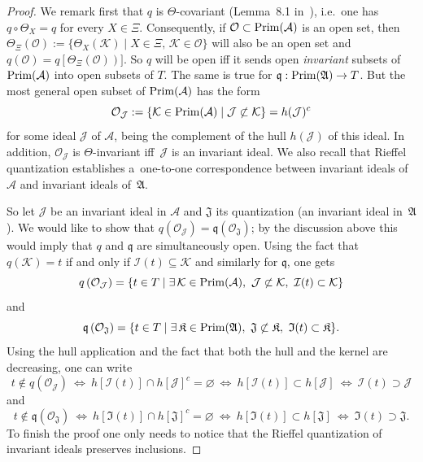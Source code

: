 \documentclass[11pt]{article}
\def\A{{\mathcal A}}
\def\Th{\Theta}
\def\AA{\mathfrak A}
\begin{document}
\begin{proof}
We remark f\/irst that $q$ is $\Th$-covariant (Lemma~8.1 in~\cite{Wi}), i.e.\ one has $q\circ\Th_X=q$ for every $X\in\Xi$.
Consequently, if $\mathcal O\subset {\rm Prim}(\A)$ is
an open set, then $\Th_\Xi(\mathcal O):=\{\Th_X(\mathcal K)\mid X\in\Xi, \, \mathcal K\in\mathcal O\}$ will also be an open set
and $q(\mathcal O)=q\left[\Th_\Xi(\mathcal O)\right)]$.
So $q$ will be open if\/f it sends open {\it invariant} subsets of ${\rm Prim}(\A)$
into open subsets of $T$. The same is true for $\mathfrak q:{\rm Prim}(\AA)\rightarrow T$. But the most general
open subset of ${\rm Prim}(\A)$ has the form
\[
\mathcal O_{\mathcal J}:=\{\mathcal K\in {\rm Prim}(\A)\mid \mathcal J\not\subset\mathcal K\}=h(\mathcal J)^c
\]
for some ideal $\mathcal J$ of $\A$, being the complement of the hull  $h(\mathcal J)$ of this ideal.
In addition, $\mathcal O_{\mathcal J}$ is $\Th$-invariant if\/f~$\mathcal J$ is an
invariant ideal. We also recall that Rief\/fel quantization establishes
a~one-to-one correspondence between invariant ideals of $\A$ and invariant ideals of~$\AA$.

So let $\mathcal J$ be an invariant ideal in $\A$ and $\mathfrak J$ its quantization
(an invariant ideal in~$\AA$). We would like to show that
$q\left(\mathcal O_\mathcal J\right)=\mathfrak q\left(\mathcal O_\mathfrak J\right)$;
by the discussion above this would imply that $q$ and $\mathfrak q$ are simultaneously open. Using the fact that
$q(\mathcal K)=t$ if and only if $\mathcal I(t)\subseteq \mathcal K$ and similarly for $\mathfrak q$, one gets
\[
q\left(\mathcal O_\mathcal J\right)=\{t\in T\mid \exists\,\mathcal K\in {\rm Prim}(\A),\ \mathcal J\not\subset\mathcal K,
\ \mathcal I(t)\subset\mathcal K\}
\]
and
\[
\mathfrak q\left(\mathcal O_\mathfrak J\right)=\{t\in T\mid \exists\,\mathfrak K\in {\rm Prim}(\AA),\
\mathfrak J\not\subset\mathfrak K,\ \mathfrak I(t)\subset\mathfrak K\}.
\]
Using the hull application  and the fact that both the hull and the kernel are decreasing, one can write
\[
t\notin q\left(\mathcal O_\mathcal J\right)\ \Longleftrightarrow\ h[\mathcal I(t)]\cap h[\mathcal J]^c=\varnothing
\ \Longleftrightarrow\ h[\mathcal I(t)]\subset h[\mathcal J]\ \Longleftrightarrow\ \mathcal I(t)\supset\mathcal J
\]
and
\[
t\notin \mathfrak q\left(\mathcal O_\mathfrak J\right)\ \Longleftrightarrow\ h[\mathfrak I(t)]\cap h[\mathfrak J]^c=\varnothing
\ \Longleftrightarrow\ h[\mathfrak I(t)]\subset h[\mathfrak J]\ \Longleftrightarrow\ \mathfrak I(t)\supset\mathfrak J.
\]
To f\/inish the proof one only needs to notice that the Rief\/fel quantization of invariant ideals preserves inclusions.
\end{proof}
\end{document}
